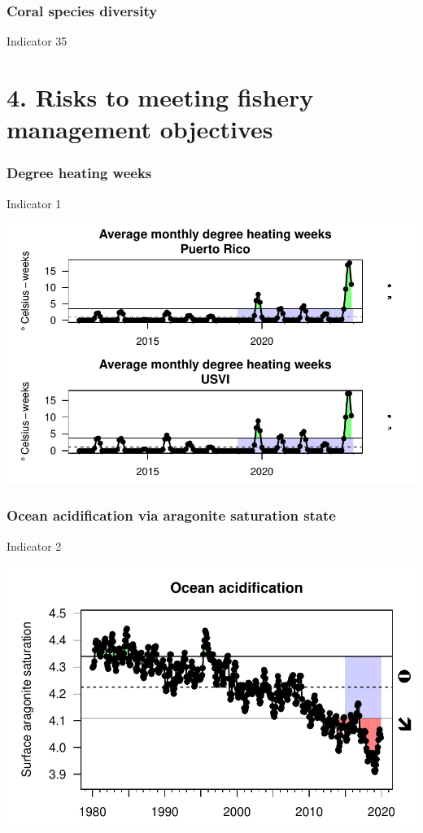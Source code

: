 \documentclass[
  letterpaper,
  oneside,
  open=any]{scrbook}
\begin{document}
\subsection{Coral species diversity}\label{coral-species-diversity}

Indicator 35


\chapter{4. Risks to meeting fishery management
objectives}\label{risks-to-meeting-fishery-management-objectives}

\subsection{Degree heating weeks}\label{degree-heating-weeks}

Indicator 1

\includegraphics{Report_book_files/Risk_indicators_files/figure-pdf/unnamed-chunk-2-1.pdf}

\subsection{Ocean acidification via aragonite saturation
state}\label{ocean-acidification-via-aragonite-saturation-state}

Indicator 2

\includegraphics{Report_book_files/Risk_indicators_files/figure-pdf/unnamed-chunk-3-1.pdf}
\end{document}
